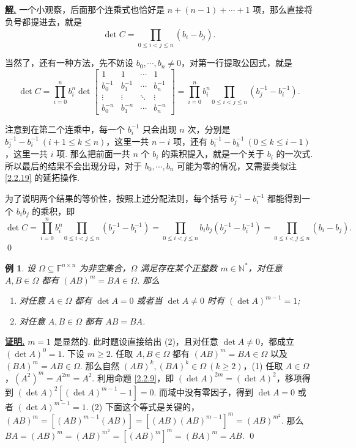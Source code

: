 \documentclass[10pt,openany]{article}
\theoremstyle{thmstyle} %
\theoremstyle{defstyle} %
\theoremstyle{prostyle} %
\theoremstyle{exastyle}
\newtheorem{example}[theorem]{例}
\theoremstyle{remstyle}
\renewenvironment{proof}[1][证明]{\par\underline{\textbf{#1.}} \;\fangsong}{\qed\par}
\newenvironment{solution}{\par\underline{\textbf{解.}} \;\fangsong}{\qed\par}
\newcommand{\F}{\mathbb{F}}
\newcommand{\n}{^{n \times n}}
\begin{document}
\begin{solution}
	一个小观察，后面那个连乘式也恰好是 \( n+(n-1)+\cdots+1 \) 项，那么直接将负号都提进去，就是
	\[ \det C=\prod_{0 \leq i<j \leq n}^{} (b_i-b_j). \]
	
	当然了，还有一种方法，先不妨设 \( b_0,\cdots,b_n \neq 0 \)，对第一行提取公因式，就是
	\[ \det C= \prod_{i=0}^{n} b_i^n \det\begin{bmatrix}
		1 & 1 & \cdots & 1 \\
		b_0^{-1} & b_1^{-1} & \cdots & b_n^{-1} \\
		\vdots & \vdots & \ddots & \vdots \\
		b_0^{-n} & b_1^{-n} & \cdots & b_n^{-n}  
	\end{bmatrix}= \prod_{i=0}^{n} b_i^n \prod_{0 \leq i<j \leq n}^{} (b_j^{-1}-b_i^{-1}). \]
	
	注意到在第二个连乘中，每一个 \( b_i^{-1} \) 只会出现 \( n \) 次，分别是 \( b_j^{-1}-b_i^{-1} \ (i+1 \leq k \leq n) \)，这里一共 \( n-i \) 项，还有 \( b_i^{-1}-b_k^{-1} \ (0 \leq k \leq i-1) \)，这里一共 \( i \) 项. 那么把前面一共 \( n \) 个 \( b_i \) 的乘积提入，就是一个关于 \( b_i \) 的一次式. 所以最后的结果不会出现分母，对于 \( b_0,\cdots,b_n  \) 可能为零的情况，又需要类似注 \ref{2.2.19} 的延拓操作.
	
	为了说明两个结果的等价性，按照上述分配法则，每个括号 \( b_j^{-1}-b_i^{-1} \) 都能得到一个 \(b_ib_j \) 的乘积，即
	\[ \det C= \prod_{i=0}^{n} b_i^n \prod_{0 \leq i<j \leq n}^{} (b_j^{-1}-b_i^{-1})= \prod_{0 \leq i<j \leq n}^{} b_ib_j (b_j^{-1}-b_i^{-1})=\prod_{0 \leq i<j \leq n}^{}  (b_i-b_j). \]
\end{solution}

\begin{example}
	设 \( \Omega \subseteq \F\n \) 为非空集合，\( \Omega \) 满足存在某个正整数 \( m \in \mathbb{N}^* \)，对任意 \( A,B \in \Omega \) 都有 \( (AB)^{m}=BA \in \Omega \). 那么
	\begin{enumerate}[(1)]
		\item 对任意 \( A \in \Omega \) 都有 \( \det A=0 \) 或者当 \( \det A \neq 0 \) 时有 \( (\det A)^{m-1}=1  \);
		\item 对任意 \( A,B \in \Omega \) 都有 \( AB=BA \).
	\end{enumerate}
\end{example}

\begin{proof}
	\( m=1 \) 是显然的. 此时题设直接给出 (2)，且对任意 \( \det A \neq 0 \)，都成立 \( (\det A)^{0}=1 \). 下设 \( m \geq 2 \). 任取 \( A,B \in \Omega \) 都有 \( (AB)^m=BA \in \Omega \) 以及 \( (BA)^m=AB \in \Omega \). 那么自然 \( (AB)^k, (BA)^k \in \Omega \ (k \geq 2) \)，(1) 任取 \( A \in \Omega \)，\( (A^2)^{m}=A^{2m}=A^2 \). 利用命题 \ref{2.2.9}，即 \( (\det A)^{2m}=(\det A)^2 \)，移项得到 \( (\det A)^2 [(\det A)^{m-1}-1]=0 \). 而域中没有零因子，得到 \( \det A=0 \) 或者 \( (\det A)^{m-1}=1 \). (2) 下面这个等式是关键的，\( (AB)^m=[(AB)^{m-1}(AB)]=[(AB)(AB)^{m-1}]^m=(AB)^{m^2} \). 那么 \( BA=(AB)^m=(AB)^{m^2}=[(AB)^m]^m=(BA)^m=AB \).
\end{proof}
\end{document}
